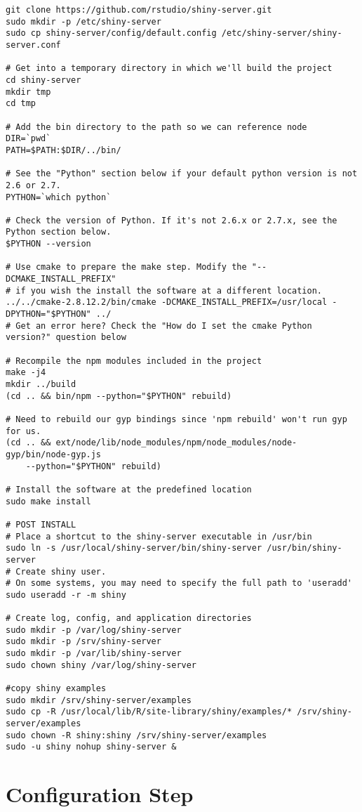 \documentclass[11pt]{article}
\begin{document}
\begin{verbatim}
git clone https://github.com/rstudio/shiny-server.git
sudo mkdir -p /etc/shiny-server
sudo cp shiny-server/config/default.config /etc/shiny-server/shiny-server.conf

# Get into a temporary directory in which we'll build the project
cd shiny-server
mkdir tmp
cd tmp

# Add the bin directory to the path so we can reference node
DIR=`pwd`
PATH=$PATH:$DIR/../bin/

# See the "Python" section below if your default python version is not 2.6 or 2.7. 
PYTHON=`which python`

# Check the version of Python. If it's not 2.6.x or 2.7.x, see the Python section below.
$PYTHON --version

# Use cmake to prepare the make step. Modify the "--DCMAKE_INSTALL_PREFIX"
# if you wish the install the software at a different location.
../../cmake-2.8.12.2/bin/cmake -DCMAKE_INSTALL_PREFIX=/usr/local -DPYTHON="$PYTHON" ../
# Get an error here? Check the "How do I set the cmake Python version?" question below

# Recompile the npm modules included in the project
make -j4
mkdir ../build
(cd .. && bin/npm --python="$PYTHON" rebuild)

# Need to rebuild our gyp bindings since 'npm rebuild' won't run gyp for us.
(cd .. && ext/node/lib/node_modules/npm/node_modules/node-gyp/bin/node-gyp.js
    --python="$PYTHON" rebuild)

# Install the software at the predefined location
sudo make install

# POST INSTALL
# Place a shortcut to the shiny-server executable in /usr/bin
sudo ln -s /usr/local/shiny-server/bin/shiny-server /usr/bin/shiny-server
# Create shiny user.
# On some systems, you may need to specify the full path to 'useradd'
sudo useradd -r -m shiny

# Create log, config, and application directories
sudo mkdir -p /var/log/shiny-server
sudo mkdir -p /srv/shiny-server
sudo mkdir -p /var/lib/shiny-server
sudo chown shiny /var/log/shiny-server

#copy shiny examples
sudo mkdir /srv/shiny-server/examples
sudo cp -R /usr/local/lib/R/site-library/shiny/examples/* /srv/shiny-server/examples
sudo chown -R shiny:shiny /srv/shiny-server/examples
sudo -u shiny nohup shiny-server &
\end{verbatim}

\section{Configuration Step}
\end{document}
